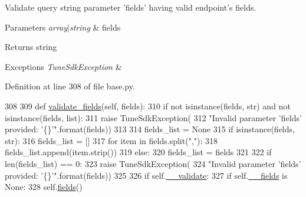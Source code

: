 Validate query string parameter 'fields' having valid endpoint's fields. 


\begin{DoxyParams}{Parameters}
{\em array$\vert$string} & fields \\
\hline
\end{DoxyParams}
\begin{DoxyReturn}{Returns}
string 
\end{DoxyReturn}

\begin{DoxyExceptions}{Exceptions}
{\em Tune\-Sdk\-Exception} & \\
\hline
\end{DoxyExceptions}


Definition at line 308 of file base.\-py.


\begin{DoxyCode}
308 
309     \textcolor{keyword}{def }\hyperlink{classtune_1_1management_1_1endpoints_1_1base_1_1TuneManagementBase_a817d9e1554db6d83669848ea01cee3ba}{validate\_fields}(self, fields):
310         \textcolor{keywordflow}{if} \textcolor{keywordflow}{not} isinstance(fields, str) \textcolor{keywordflow}{and} \textcolor{keywordflow}{not} isinstance(fields, list):
311             \textcolor{keywordflow}{raise} TuneSdkException(
312                 \textcolor{stringliteral}{"Invalid parameter 'fields' provided: '\{\}'"}.format(fields))
313 
314         fields\_list = \textcolor{keywordtype}{None}
315         \textcolor{keywordflow}{if} isinstance(fields, str):
316             fields\_list = []
317             \textcolor{keywordflow}{for} item \textcolor{keywordflow}{in} fields.split(\textcolor{stringliteral}{","}):
318                 fields\_list.append(item.strip())
319         \textcolor{keywordflow}{else}:
320             fields\_list = fields
321 
322         \textcolor{keywordflow}{if} len(fields\_list) == 0:
323             \textcolor{keywordflow}{raise} TuneSdkException(
324                 \textcolor{stringliteral}{"Invalid parameter 'fields' provided: '\{\}'"}.format(fields))
325 
326         \textcolor{keywordflow}{if} self.\hyperlink{classtune_1_1management_1_1endpoints_1_1base_1_1TuneManagementBase_a1cbfd5de3682af94b39f02abfd89e1dc}{\_\_validate}:
327             \textcolor{keywordflow}{if} self.\hyperlink{classtune_1_1management_1_1endpoints_1_1base_1_1TuneManagementBase_ac4a85901e26423540bf102209827a737}{\_\_fields} \textcolor{keywordflow}{is} \textcolor{keywordtype}{None}:
328                 self.\hyperlink{classtune_1_1management_1_1endpoints_1_1base_1_1TuneManagementBase_abf3e64564de650a15b23f5be8b9d8058}{fields}()

\end{DoxyCode}

